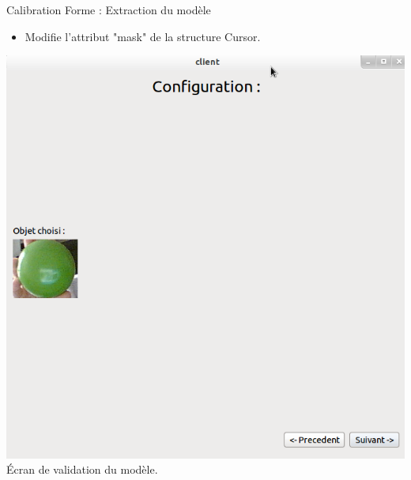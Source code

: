 \documentclass{beamer}
\begin{document}
	    \begin{frame}{Calibration Forme : Extraction du modèle}
                  \begin{itemize}
                        \item{Modifie l'attribut "mask" de la structure Cursor.}
                  \end{itemize}
                  \begin{center}
                        \includegraphics[scale=0.25]{Capture7.png}\\
                        Écran de validation du modèle.
                  \end{center}
            \end{frame}
            
\end{document}

